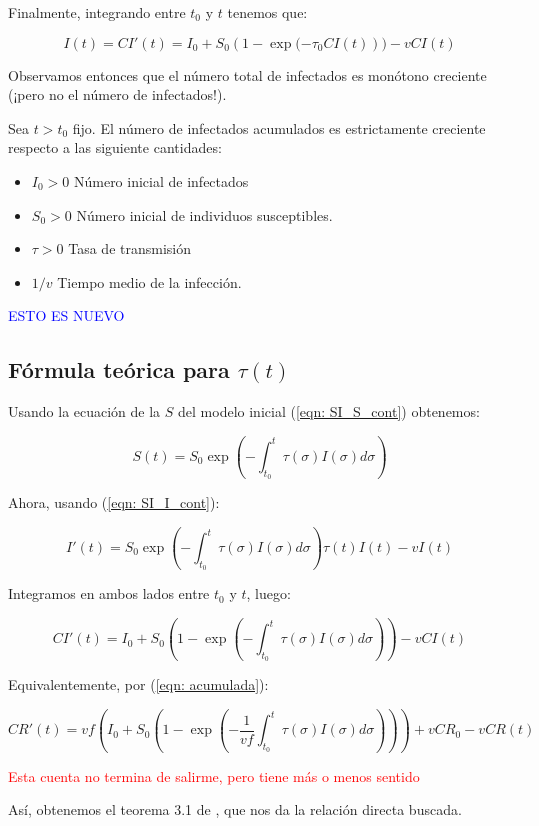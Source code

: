 Finalmente, integrando entre $t_0$ y $t$ tenemos que:

$$I(t)=CI'(t)=I_0+S_0(1-\exp{(-\tau_0 CI(t)}))-vCI(t)$$

Observamos entonces que el número total de infectados es monótono creciente (¡pero no el número de infectados!). 

\begin{theorem}
Sea $t>t_0$ fijo. El número de infectados acumulados es estrictamente creciente respecto a las siguiente cantidades:
\begin{itemize}
\item $I_0>0$ Número inicial de infectados
\item $S_0>0$ Número inicial de individuos susceptibles.
\item $\tau>0$ Tasa de transmisión
\item $1/v$ Tiempo medio de la infección.
\end{itemize}
\end{theorem}

\textcolor{blue}{ESTO ES NUEVO}

\subsection{Fórmula teórica para $\tau (t)$}

Usando la ecuación de la $S$ del modelo inicial (\ref{eqn: SI_S_cont}) obtenemos:

$$S(t) = S_0 \exp{\left( - \int_{t_0}^t \tau(\sigma ) I(\sigma ) d\sigma \right) } $$ 

Ahora, usando (\ref{eqn: SI_I_cont}):

$$I'(t) = S_0 \exp{\left( - \int_{t_0}^t \tau(\sigma ) I(\sigma ) d\sigma \right) } \tau (t) I(t) -vI(t) $$

Integramos en ambos lados entre $t_0$ y $t$, luego:

$$ CI'(t) = I_0 + S_0 \left( 1-\exp{\left(- \int_{t_0}^t \tau (\sigma ) I(\sigma )d\sigma \right)}\right) -vCI(t)$$

Equivalentemente, por (\ref{eqn: acumulada}):

$$CR'(t) = vf\left( I_0 + S_0 \left( 1-\exp{\left(- \frac{1}{vf}\int_{t_0}^t \tau (\sigma ) I(\sigma )d\sigma \right)}\right)\right) +vCR_0 -vCR(t)$$

\textcolor{red}{Esta cuenta no termina de salirme, pero tiene más o menos sentido}

Así, obtenemos el teorema 3.1 de \cite{demongeotSIEpidemicModel}, que nos da la relación directa buscada.







